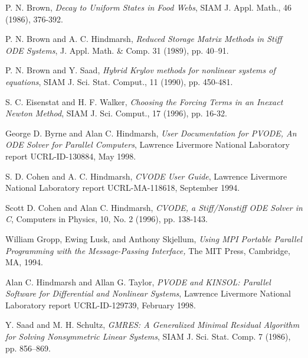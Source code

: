 \begin{thebibliography}{9}

P. N. Brown, {\em Decay to Uniform States in Food Webs}, SIAM J. Appl.
Math., 46 (1986), 376-392.

P. N. Brown and A. C. Hindmarsh, {\it Reduced Storage Matrix Methods
in Stiff ODE Systems}, J. Appl. Math. \& Comp. 31 (1989), pp. 40--91.

P. N. Brown and Y. Saad, {\it Hybrid Krylov methods for 
nonlinear systems of equations}, SIAM J. Sci. Stat. Comput., 11 (1990), 
pp. 450-481.

S. C. Eisenstat and H. F. Walker, {\it Choosing the Forcing Terms in an Inexact
Newton Method}, SIAM J. Sci. Comput., 17 (1996),
pp. 16-32.

 George D. Byrne and Alan C. Hindmarsh,
{\it User Documentation for PVODE, An ODE Solver for Parallel Computers}, 
Lawrence Livermore National Laboratory report UCRL-ID-130884, May 1998.

S. D. Cohen and A. C. Hindmarsh, {\it CVODE User Guide},
Lawrence Livermore National Laboratory report UCRL-MA-118618,
September 1994.

  Scott D. Cohen and Alan C. Hindmarsh, {\it CVODE, a
Stiff/Nonstiff ODE Solver in C}, Computers in Physics, 10, No. 2
(1996), pp. 138-143.

  William Gropp, Ewing Lusk, and Anthony Skjellum, {\it Using
MPI Portable Parallel Programming with the Message-Passing Interface, }The
MIT Press, Cambridge, MA, 1994.

Alan C. Hindmarsh and Allan G. Taylor, {\it PVODE and KINSOL: Parallel Software
for Differential and Nonlinear Systems}, Lawrence Livermore National Laboratory
report UCRL-ID-129739, February 1998.

Y. Saad and M. H. Schultz, {\it GMRES: A Generalized Minimal Residual
Algorithm for Solving Nonsymmetric Linear Systems}, SIAM J. Sci. Stat.
Comp. 7 (1986), pp. 856--869.

\end{thebibliography}


\newpage
